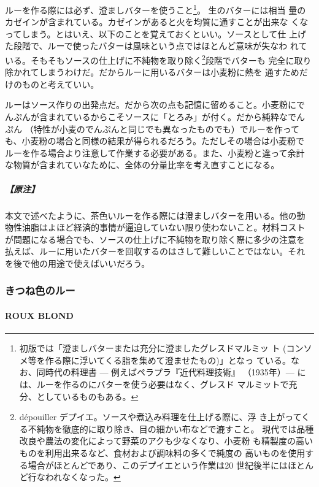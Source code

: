 \documentclass[twoside,12Q,b5j]{escoffierltjsbook}
\newenvironment{recette}{\begin{multicols}{2}}{\end{multicols}}
\begin{document}
\begin{recette}
ルーを作る際には必ず、澄ましバターを使うこと\footnote{初版では「澄ましバターまたは充分に澄ましたグレスドマルミッ
  ト (コンソメ等を作る際に浮いてくる脂を集めて澄ませたもの)」となっ
  ている。なお、同時代の料理書 --- 例えばペラプラ『近代料理技術』
  （1935年）--- には、ルーを作るのにバターを使う必要はなく、グレスド
  マルミットで充分、としているものもある。}。 生のバターには相当
量のカゼインが含まれている。カゼインがあると火を均質に通すことが出来な
くなってしまう。とはいえ、以下のことを覚えておくといい。ソースとして仕
上げた段階で、ルーで使ったバターは風味という点ではほとんど意味が失なわ
れている。そもそもソースの仕上げに不純物を取り除く\footnote{dépouiller
  デプイエ。ソースや煮込み料理を仕上げる際に、浮
  き上がってくる不純物を徹底的に取り除き、目の細かい布などで漉すこと。
  現代では品種改良や農法の変化によって野菜のアクも少なくなり、小麦粉
  も精製度の高いものを利用出来るなど、食材および調味料の多くで純度の
  高いものを使用する場合がほとんどであり、このデプイエという作業は20
  世紀後半にはほとんど行なわれなくなった。}段階でバターも
完全に取り除かれてしまうわけだ。だからルーに用いるバターは小麦粉に熱を
通すためだけのものと考えていい。

ルーはソース作りの出発点だ。だから次の点も記憶に留めること。小麦粉にで
んぷんが含まれているからこそソースに「とろみ」が付く。だから純粋なでん
ぷん （特性が小麦のでんぷんと同じでも異なったものでも）でルーを作って
も、小麦粉の場合と同様の結果が得られるだろう。ただしその場合は小麦粉で
ルーを作る場合より注意して作業する必要がある。また、小麦粉と違って余計
な物質が含まれていなために、全体の分量比率を考え直すことになる。

\subparagraph{【原注】}\label{ux539fux6ce8-6}

本文で述べたように、茶色いルーを作る際には澄ましバターを用いる。他の動
物性油脂はよほど経済的事情が逼迫していない限り使わないこと。材料コスト
が問題になる場合でも、ソースの仕上げに不純物を取り除く際に多少の注意を
払えば、ルーに用いたバターを回収するのはさして難しいことではない。それ
を後で他の用途で使えばいいだろう。

\vspace*{2\zw}

\subsubsection{きつね色のルー}\label{ux304dux3064ux306dux8272ux306eux30ebux30fc}

\paragraph{ROUX BLOND}\label{roux-blond}


\end{recette}
\end{document}
